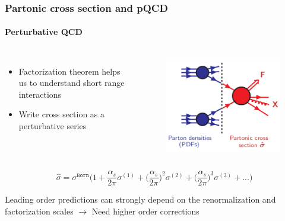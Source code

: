 \documentclass[aspectratio=43]{beamer}
\begin{document}
\begin{frame}

	\frametitle{Partonic cross section and pQCD}
	\framesubtitle{Perturbative QCD}
	\begin{columns}
		
		
		\begin{itemize}
			\item Factorization theorem helps us to understand short range interactions
			\item Write cross section as a perturbative series
			
		\end{itemize}
		
		\begin{figure}[!htb]
			\includegraphics[width = 5 cm]{plots/factorization_3.png}
		\end{figure}
	
	\end{columns}
	
	\begin{equation}
		\hat{\sigma} = \sigma^{\texttt{Born}} \Bigg( 1 +
		\frac{\alpha_{s}}{2\pi} \sigma^{(1)} + 
		\Big(\frac{\alpha_{s}}{2\pi}\Big)^{2} \sigma^{(2)} + 
		\Big(\frac{\alpha_{s}}{2\pi}\Big)^{3} \sigma^{(3)} + ... \Bigg) \nonumber
	\end{equation}
	
	Leading order predictions can strongly depend on the renormalization and factorization scales $\rightarrow$ {\color{red}Need higher order corrections}

\end{frame}

\begin{frame}


\end{frame}
\end{document}
